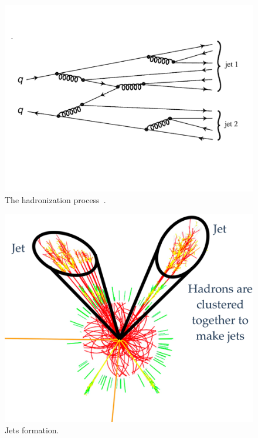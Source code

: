 \begin{figure}[htb]
\centering
\includegraphics[width=.7\textwidth]{figures/jets.png}
\caption{The hadronization process~\cite{particlebook1}.}
\label{fig:hadronization}
\end{figure}  

\begin{figure}[htb]
\centering
\includegraphics[width=.7\textwidth]{figures/clustering.png}
\caption{Jets formation.}
\label{fig:jet_formation}
\end{figure}  











